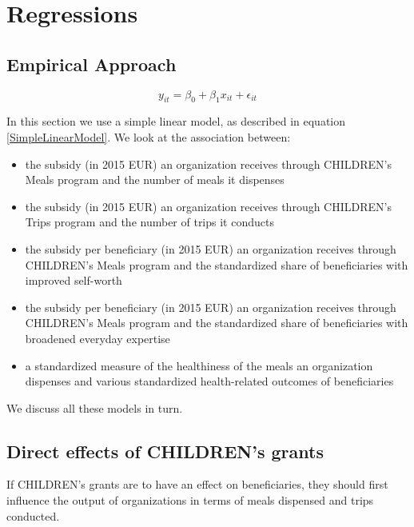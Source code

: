 \documentclass[12pt, a4paper, titlepage]{article}\usepackage[]{graphicx}\usepackage[]{color}
\begin{document}
\section{Regressions}

\subsection{Empirical Approach} 

\begin{equation}
\label{SimpleLinearModel}
  y_{it} = \beta_0 + \beta_1 x_{it} + \epsilon_{it}
\end{equation}

In this section we use a simple linear model, as described in equation \ref{SimpleLinearModel}. We look at the association between: 

\begin{itemize}
  \item{the subsidy (in 2015 EUR) an organization receives through CHILDREN's Meals program and the number of meals it dispenses}
  \item{the subsidy (in 2015 EUR) an organization receives through CHILDREN's Trips program and the number of trips it conducts}
  \item{the subsidy per beneficiary (in 2015 EUR) an organization receives through CHILDREN's Meals program and the standardized share of beneficiaries with improved self-worth}
  \item{the subsidy per beneficiary (in 2015 EUR) an organization receives through CHILDREN's Meals program and the standardized share of beneficiaries with broadened everyday expertise}
   \item{a standardized measure of the healthiness of the meals an organization dispenses and various standardized health-related outcomes of beneficiaries} 
\end{itemize}

We discuss all these models in turn.

\subsection{Direct effects of CHILDREN's grants} 

If CHILDREN's grants are to have an effect on beneficiaries, they should first influence the output of organizations in terms of meals dispensed and trips conducted. 
\end{document}
